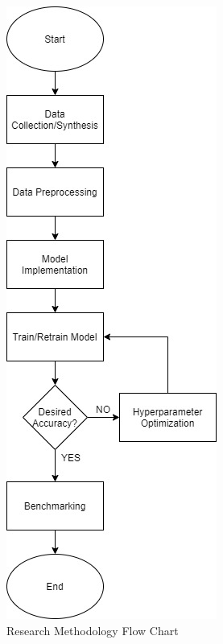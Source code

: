 \begin{figure}
    \centering
    \includegraphics[scale=0.8]{flow-Page-1.jpg}
    \caption{Research Methodology Flow Chart}
    \label{fig:flowchart}
\end{figure}
